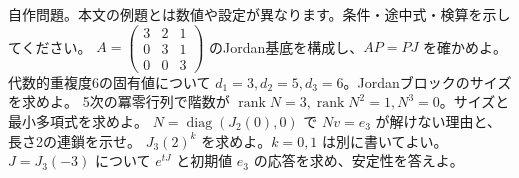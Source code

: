 \documentclass[11pt]{article}
\begin{document}
自作問題。本文の例題とは数値や設定が異なります。条件・途中式・検算を示してください。
\problem[連鎖を作る]
$A=\begin{pmatrix}3&2&1\\0&3&1\\0&0&3\end{pmatrix}$ のJordan基底を構成し、$AP=PJ$ を確かめよ。
\workspace{45mm}
\problem[核からサイズを復元]
代数的重複度6の固有値について $d_1=3,d_2=5,d_3=6$。Jordanブロックのサイズを求めよ。
\workspace{45mm}
\newpage
\problem[階数からサイズを復元]
5次の冪零行列で階数が $\operatorname{rank}N=3,\operatorname{rank}N^2=1,N^3=0$。サイズと最小多項式を求めよ。
\workspace{45mm}
\problem[伸ばせない固有ベクトル]
$N=\operatorname{diag}(J_2(0),0)$ で $Nv=e_3$ が解けない理由と、長さ2の連鎖を示せ。
\workspace{45mm}
\newpage
\problem[ブロックの累乗]
$J_3(2)^k$ を求めよ。$k=0,1$ は別に書いてよい。
\workspace{45mm}
\problem[指数関数]
$J=J_3(-3)$ について $e^{tJ}$ と初期値 $e_3$ の応答を求め、安定性を答えよ。
\workspace{45mm}
\end{document}

